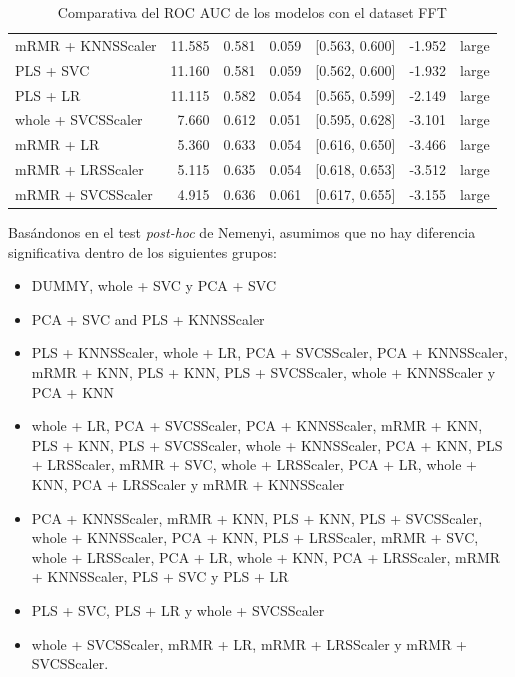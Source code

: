 \documentclass[a4paper,oneside,11pt,leqno]{article}
\begin{document}
\begin{table}[h]
\begin{tabular}{lrrrlll}
			mRMR + KNNSScaler  & 11.585 & 0.581 & 0.059 &  [0.563, 0.600] & -1.952 &       large \\
			PLS + SVC          & 11.160 & 0.581 & 0.059 &  [0.562, 0.600] & -1.932 &       large \\
			PLS + LR           & 11.115 & 0.582 & 0.054 &  [0.565, 0.599] & -2.149 &       large \\
			whole + SVCSScaler &  7.660 & 0.612 & 0.051 &  [0.595, 0.628] & -3.101 &       large \\
			mRMR + LR          &  5.360 & 0.633 & 0.054 &  [0.616, 0.650] & -3.466 &       large \\
			mRMR + LRSScaler   &  5.115 & 0.635 & 0.054 &  [0.618, 0.653] & -3.512 &       large \\
			mRMR + SVCSScaler  &  4.915 & 0.636 & 0.061 &  [0.617, 0.655] & -3.155 &       large \\
			\bottomrule
		\end{tabular}
		\caption{Comparativa del ROC AUC de los modelos con el dataset FFT}
		\label{tab:stat_results_fft}
	\end{table}

	Basándonos en el test \textit{post-hoc} de Nemenyi, asumimos que no hay diferencia significativa dentro de los siguientes grupos:

	\begin{itemize}
		\item DUMMY, whole + SVC y PCA + SVC

		\item PCA + SVC and PLS + KNNSScaler


		\item  PLS + KNNSScaler, whole + LR, PCA + SVCSScaler, PCA + KNNSScaler, mRMR + KNN, PLS + KNN, PLS + SVCSScaler, whole + KNNSScaler y PCA + KNN


		\item whole + LR, PCA + SVCSScaler, PCA + KNNSScaler, mRMR + KNN, PLS + KNN, PLS + SVCSScaler, whole + KNNSScaler, PCA + KNN, PLS + LRSScaler, mRMR + SVC, whole + LRSScaler, PCA + LR, whole + KNN, PCA + LRSScaler y mRMR + KNNSScaler


		\item PCA + KNNSScaler, mRMR + KNN, PLS + KNN, PLS + SVCSScaler, whole + KNNSScaler, PCA + KNN, PLS + LRSScaler, mRMR + SVC, whole + LRSScaler, PCA + LR, whole + KNN, PCA + LRSScaler, mRMR + KNNSScaler, PLS + SVC y PLS + LR


		\item PLS + SVC, PLS + LR y whole + SVCSScaler

		\item whole + SVCSScaler, mRMR + LR, mRMR + LRSScaler y mRMR + SVCSScaler.
	\end{itemize}
\end{document}
